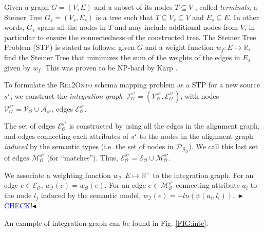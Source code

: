 \documentclass[letterpaper]{article} %
\newcommand{\authornote}[3]{
  {\fbox{\sc 
  #1}:$\blacktriangleright$\textcolor{#2}{\small{#3}}$\blacktriangleleft$}%
}
\newcommand{\ddg}[1]{\authornote{DDG}{blue}{#1}}
\newcommand{\relonto}{\textsc{Rel2Onto}}
\begin{document}
Given a graph $G =
(V, E)$ and a subset of its nodes $T \subseteq V$ , called \emph{terminals}, a 
Steiner Tree $G_s = (V_s, E_s )$ is a tree such that $T \subseteq V_s \subseteq 
V$ and $E_s \subseteq E$. In other words, $G_s$ spans all the nodes in $T$ and 
may include additional nodes from $V$, in particular to ensure the 
connectedness of the constructed tree. The Steiner Tree Problem 
(STP) is stated as follows: given $G$ and a weight function $w_f : E 
\mapsto \mathbb{R}$, find the Steiner Tree that minimizes the sum of the 
weights of the edges in $E_s$ given by $w_f$. This was proven to be NP-hard 
by Karp \cite{Karp1972}.

To formulate the \relonto{} schema mapping problem as a STP for a new source 
$s^\star$, we construct the 
\emph{integration graph} $~\mathcal{I}_\mathcal{O}^{s^\star} = 
(\mathcal{V}_\mathcal{O}^{s^\star},\mathcal{E}_\mathcal{O}^{s^\star})$, with 
nodes $\mathcal{V}_\mathcal{O}^{s^\star} = \mathcal{V_O} \cup 
\mathcal{A}_{s^\star}$, 
edges $\mathcal{E}_\mathcal{O}^{s^\star}$.

The set of edges $\mathcal{E}_\mathcal{O}^{s^\star}$ is constructed by using 
all the edges in the alignment 
graph, and edges connecting each attributes of $s^\star$ to the nodes in the 
alignment graph \emph{induced} by the semantic types (i.e. the set of nodes in 
$\mathcal{D_{G_O}}$). We call this last set 
of edges $\mathcal{M}_\mathcal{O}^{s^\star}$ (for ``matches''). Thus, 
$\mathcal{E}_\mathcal{O}^{s^\star} = 
\mathcal{E_O} \cup \mathcal{M}_\mathcal{O}^{s^\star}$.

We associate a weighting function  $w_\mathcal{I} : E \mapsto \mathbb{R}^+$ to 
the integration graph. For an edge $e \in \mathcal{E_O}$, $w_\mathcal{I}(e) = 
w_\mathcal{O}(e)$. For an edge $e 
\in \mathcal{M}_\mathcal{O}^{s^\star}$ connecting attribute $a_i$ to the node 
$l_j$ induced by the semantic model, $w_\mathcal{I}(e) = - 
ln(\psi(a_i,l_i))$. \ddg{CHECK!}

An example of integration graph can be found in Fig. \ref{FIG:inte}.
\end{document}
